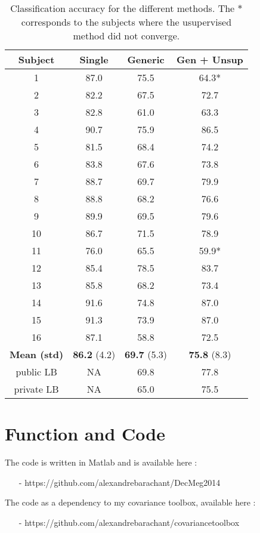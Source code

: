 \documentclass[11pt,a4paper]{article}
\begin{document}
\begin{table}[h]
\begin{center}
\begin{tabular}{|c|c||c|c|}
\hline
Subject & Single & Generic    & Gen + Unsup     \\
\hline
1       & 87.0     & 75.5     & 64.3*   \\
2       & 82.2     & 67.5     & 72.7    \\
3       & 82.8     & 61.0     & 63.3   \\
4       & 90.7     & 75.9     & 86.5   \\
5       & 81.5     & 68.4     & 74.2   \\
6       & 83.8     & 67.6     & 73.8   \\
7       & 88.7     & 69.7     & 79.9   \\
8       & 88.8     & 68.2     & 76.6   \\
9       & 89.9     & 69.5     & 79.6   \\
10      & 86.7     & 71.5     & 78.9   \\
11      & 76.0     & 65.5     & 59.9*   \\
12      & 85.4     & 78.5     & 83.7   \\
13      & 85.8     & 68.2     & 73.4   \\
14      & 91.6     & 74.8     & 87.0   \\
15      & 91.3     & 73.9     & 87.0   \\
16      & 87.1     & 58.8     & 72.5   \\
\hline
\hline
\textbf{Mean (std) }   & \textbf{86.2 } (4.2) & \textbf{69.7} (5.3)& \textbf{75.8} (8.3) \\
\hline
public LB & NA & 69.8 & 77.8\\
private LB & NA & 65.0 & 75.5\\
\hline
\hline
\end{tabular}
\caption{Classification accuracy for the different methods. The $*$ corresponds to the subjects where the usupervised method did not converge.}
\end{center}
\end{table}

\section{Function and Code}
The code is written in Matlab and is available here : 
\begin{itemize}
\item[-] https://github.com/alexandrebarachant/DecMeg2014
\end{itemize}
The code as a dependency to my covariance toolbox, available here : 
\begin{itemize}
\item[-] https://github.com/alexandrebarachant/covariancetoolbox
\end{itemize}
\end{document}
